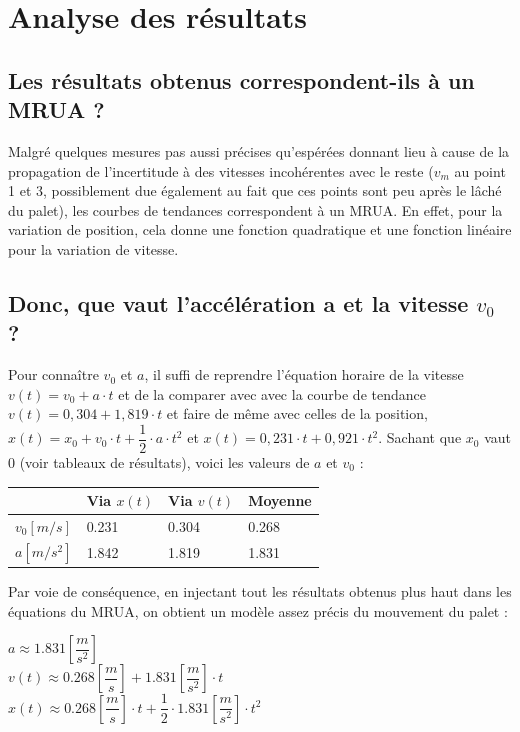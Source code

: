 \documentclass[11pt]{article}
\begin{document}
\section{Analyse des résultats}
\subsection*{Les résultats obtenus correspondent-ils à un MRUA ?}
Malgré quelques mesures pas aussi précises qu’espérées donnant lieu à cause de la propagation de l’incertitude à des vitesses incohérentes avec le reste ($v_m$ au point 1 et 3, possiblement due également au fait que ces points sont peu après le lâché du palet), les courbes de tendances correspondent à un MRUA. En effet, pour la variation de position, cela donne une fonction quadratique et une fonction linéaire pour la variation de vitesse.

\subsection*{Donc, que vaut l’accélération a et la vitesse $v_0$ ?}
Pour connaître $v_0$ et $a$, il suffi de reprendre l’équation horaire de la vitesse $v(t)= v_0+a \cdot t $ et de la comparer avec avec la courbe de tendance $v(t)= 0,304 + 1,819 \cdot t $ et faire de même avec celles de la position, $x(t)=x_0+v_0 \cdot t + \dfrac{1}{2} \cdot a \cdot t^2 $ et $x(t)=0,231 \cdot t + 0,921 \cdot t^2 $. Sachant que $x_0$ vaut 0 (voir tableaux de résultats), voici les valeurs de $a$ et $v_0$ :
\begin{center}
\begin{tabular}{ |>{\columncolor{gray}} l || l |>{\columncolor{lightgray}} l | l | }
\hline
	\rowcolor{gray} \cellcolor{black} & Via $x(t)$ & Via $v(t)$ & Moyenne \\ \hline \hline
	$v_0[m/s]$ & 0.231 & 0.304 & 0.268 \\ \hline
	$a[m/s^2]$ & 1.842 & 1.819 & 1.831 \\ \hline
\end{tabular}
\end{center}
Par voie de conséquence, en injectant tout les résultats obtenus plus haut dans les équations du MRUA, on obtient un modèle assez précis du mouvement du palet :
\begin{center}
$a \approx 1.831 \left[\dfrac{m}{s^2} \right]$\\
$v(t) \approx 0.268 \left[\dfrac{m}{s} \right] + 1.831 \left[\dfrac{m}{s^2} \right] \cdot t $\\
$x(t) \approx 0.268 \left[\dfrac{m}{s} \right] \cdot t + \dfrac{1}{2} \cdot 1.831 \left[\dfrac{m}{s^2} \right] \cdot t^2 $
\end{center}
\end{document}
